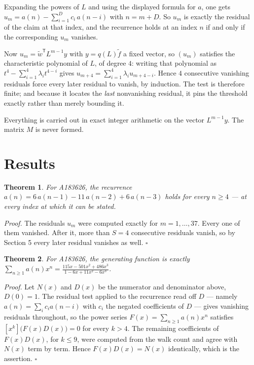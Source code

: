 \documentclass[11pt]{article}
\newtheorem{theorem}{Theorem}
\theoremstyle{definition}
\begin{document}
Expanding the powers of $L$ and using the displayed formula for $a$, one gets $u_m = a(n) - \sum_{i=1}^{D} c_i\,a(n-i)$ with $n = m + D$. So $u_m$ is exactly the residual of the claim at that index, and the recurrence holds at an index $n$ if and only if the corresponding $u_m$ vanishes.

Now $u_m = \tilde w^{\mathsf T} L^{m-1} y$ with $y = q(L)\tilde f$ a fixed vector, so $(u_m)$ satisfies the characteristic polynomial of $L$, of degree $4$: writing that polynomial as $t^{4} - \sum_{i=1}^{4} \lambda_i t^{4-i}$ gives $u_{m+4} = \sum_{i=1}^{4} \lambda_i u_{m+4-i}$. Hence $4$ consecutive vanishing residuals force every later residual to vanish, by induction. The test is therefore finite; and because it locates the {\itshape last} nonvanishing residual, it pins the threshold exactly rather than merely bounding it.

Everything is carried out in exact integer arithmetic on the vector $L^{m-1}y$. The matrix $M$ is never formed.

\section{Results}

\begin{theorem} For A183626, the recurrence $a(n) = 6\,a(n-1) - 11\,a(n-2) + 6\,a(n-3)$ holds for every $n \ge 4$ --- at every index at which it can be stated.\end{theorem}

{\itshape Proof.} The residuals $u_m$ were computed exactly for $m = 1,\dots,37$. Every one of them vanished. After it, more than $S = 4$ consecutive residuals vanish, so by Section 5 every later residual vanishes as well. $\square$

\begin{theorem} For A183626, the generating function is exactly $\sum_{n\ge 1} a(n)x^n = \frac{115x - 501x^{2} + 486x^{3}}{1 - 6x + 11x^{2} - 6x^{3}}$.\end{theorem}

{\itshape Proof.} Let $N(x)$ and $D(x)$ be the numerator and denominator above, $D(0)=1$. The residual test applied to the recurrence read off $D$ --- namely $a(n) = \sum_i c_i a(n-i)$ with $c_i$ the negated coefficients of $D$ --- gives vanishing residuals throughout, so the power series $F(x)=\sum_{n\ge 1}a(n)x^n$ satisfies $[x^k]\bigl(F(x)D(x)\bigr) = 0$ for every $k > 4$. The remaining coefficients of $F(x)D(x)$, for $k \le 9$, were computed from the walk count and agree with $N(x)$ term by term. Hence $F(x)D(x) = N(x)$ identically, which is the assertion. $\square$
\end{document}
